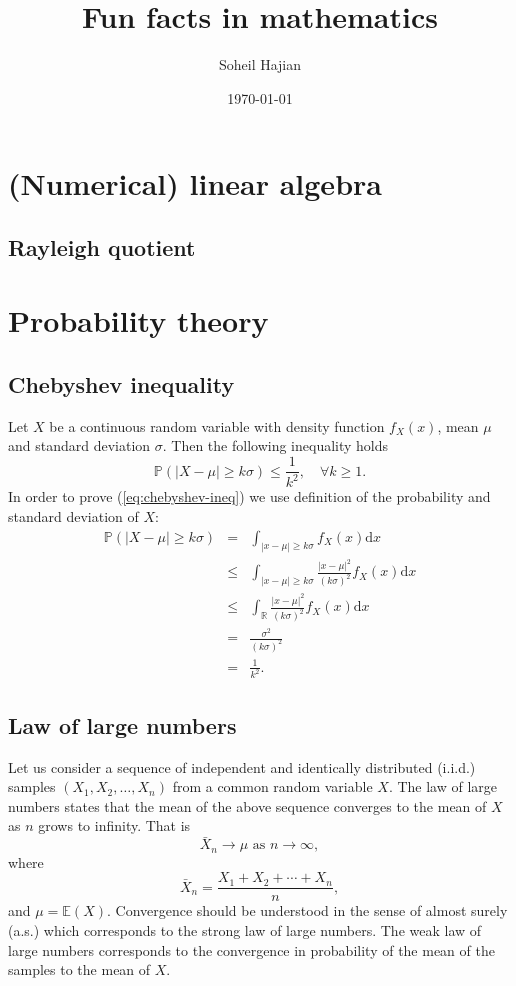 \documentclass[11pt]{article}
\title{Fun facts in mathematics} \author{Soheil Hajian} \date{\today}
\newcommand{\R}{\mathbb{R}}
\newcommand{\Pro}{\mathbb{P}}
\newcommand{\dx}{\text{d}x}
\newcommand{\red}[1]{{\color{red}#1}}
\begin{document}
\maketitle
\tableofcontents
\pagebreak

\section{(Numerical) linear algebra}
\subsection{\red{Rayleigh quotient}} \label{sec:rayleigh}
\section{Probability theory}
\subsection{Chebyshev inequality}
Let $X$ be a continuous random variable with density function
$f_X(x)$, mean $\mu$ and standard deviation $\sigma$. Then the
following inequality holds
\begin{equation} \label{eq:chebyshev-ineq}
  \Pro(|X-\mu| \geq k \sigma) \leq \frac{1}{k^2}, \quad \forall k \geq
  1.
\end{equation}
In order to prove (\ref{eq:chebyshev-ineq}) we use definition of the
probability and standard deviation of $X$:
\begin{equation}
  \begin{array}{rcl}
    \Pro(|X-\mu| \geq k \sigma) &=& \int_{|x-\mu|\geq k\sigma} f_X(x)
    \dx \\ &\leq& \int_{|x-\mu|\geq k\sigma}
    \frac{|x-\mu|^2}{(k\sigma)^2} f_X(x) \dx \\ &\leq& \int_{\R}
    \frac{|x-\mu|^2}{(k\sigma)^2} f_X(x) \dx \\ &=&
    \frac{\sigma^2}{(k\sigma)^2} \\ &=& \frac{1}{k^2}.
  \end{array}
\end{equation}
%
\subsection{Law of large numbers}
Let us consider a sequence of independent and identically distributed
(i.i.d.) samples $(X_1, X_2, \dots, X_n)$ from a common random
variable $X$. The law of large numbers states that the mean of the
above sequence converges to the mean of $X$ as $n$ grows to
infinity. That is
\begin{equation}
  \bar{X}_n \rightarrow \mu \text{ as } n \rightarrow \infty,
\end{equation}
where
\begin{equation}
  \bar{X}_n = \frac{X_1 + X_2 + \cdots + X_n}{n},
\end{equation}
and $\mu = \mathbb{E}(X)$. Convergence should be understood in the
sense of almost surely (a.s.) which corresponds to the strong law of
large numbers. The weak law of large numbers corresponds to the
convergence in probability of the mean of the samples to the mean of
$X$.
\end{document}
